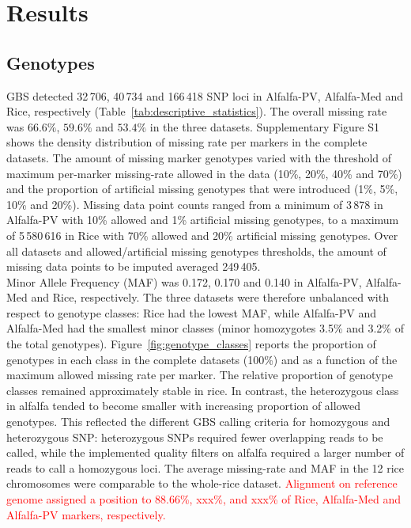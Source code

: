\section{Results}
\label{sec:results}

\subsection{Genotypes}
\label{sec:genotypes}  
GBS detected 32\,706, 40\,734 and 166\,418 SNP loci in Alfalfa-PV, Alfalfa-Med and Rice, respectively (Table~\ref{tab:descriptive_statistics}). The overall missing rate was $66.6\%$, $59.6\%$ and $53.4\%$ in the three datasets. Supplementary Figure S1 shows the density distribution of missing rate per markers in the complete datasets. The amount of missing marker genotypes varied with the threshold of maximum per-marker missing-rate allowed in the data (10\%, 20\%, 40\% and 70\%) and the proportion of artificial missing genotypes that were introduced (1\%, 5\%, 10\% and 20\%). Missing data point counts ranged from a minimum of 3\,878 in Alfalfa-PV with 10\% allowed and 1\% artificial missing genotypes, to a maximum of 5\,580\,616 in Rice with 70\% allowed and 20\% artificial missing genotypes. Over all datasets and allowed/artificial missing genotypes thresholds, the amount of missing data points to be imputed averaged 249\,405.\\
Minor Allele Frequency (MAF) was 0.172, 0.170 and 0.140 in Alfalfa-PV, Alfalfa-Med and Rice, respectively. The three datasets were therefore unbalanced with respect to genotype classes: Rice had the lowest MAF, while Alfalfa-PV and Alfalfa-Med had the smallest minor classes (minor homozygotes 3.5\% and 3.2\% of the total genotypes). Figure~\ref{fig:genotype_classes} reports the proportion of genotypes in each class in the complete datasets (100\%) and as a function of the maximum allowed missing rate per marker. The relative proportion of genotype classes remained approximately stable in rice. In contrast, the heterozygous class in alfalfa tended to become smaller with increasing proportion of allowed genotypes. This reflected the different GBS calling criteria for homozygous and heterozygous SNP: heterozygous SNPs required fewer overlapping reads to be called, while the implemented quality filters on alfalfa required a larger number of reads to call a homozygous loci. The average missing-rate and MAF in the 12 rice chromosomes were comparable to the whole-rice dataset.
\textcolor{red}{
Alignment on reference genome assigned a position to 88.66\%, xxx\%, and xxx\% of Rice, Alfalfa-Med and Alfalfa-PV markers, respectively.
}


